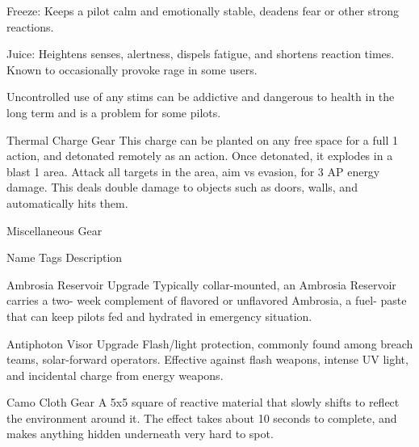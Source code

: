                                      Freeze: Keeps a pilot calm and emotionally stable,
                                     deadens fear or other strong reactions.

                                     Juice: Heightens senses, alertness, dispels fatigue, and
                                     shortens reaction times. Known to occasionally provoke
                                     rage in some users.


                                     Uncontrolled use of any stims can be addictive and
                                     dangerous to health in the long term and is a problem for
                                     some pilots.

  Thermal Charge          Gear       This charge can be planted on any free space for a full                1
                                     action, and detonated remotely as an action. Once
                                     detonated, it explodes in a blast 1 area. Attack all targets
                                     in the area, aim vs evasion, for 3 AP energy damage. This
                                     deals double damage to objects such as doors, walls, and
                                     automatically hits them.

                                                Miscellaneous Gear

          Name                   Tags                                       Description

Ambrosia Reservoir            Upgrade        Typically collar-mounted, an Ambrosia Reservoir carries a two-
                                             week complement of flavored or unflavored Ambrosia, a fuel-
                                             paste that can keep pilots fed and hydrated in emergency
                                             situation.

Antiphoton Visor              Upgrade        Flash/light protection, commonly found among breach teams,
                                             solar-forward operators. Effective against flash weapons, intense
                                             UV light, and incidental charge from energy weapons.

Camo Cloth                    Gear           A 5x5 square of reactive material that slowly shifts to reflect the
                                             environment around it. The effect takes about 10 seconds to
                                             complete, and makes anything hidden underneath very hard to
                                             spot.

